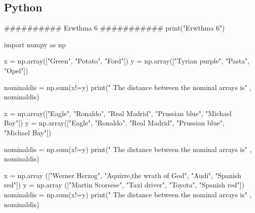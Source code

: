 \documentclass[10pt,towside,a4paper]{article}
\begin{document}
\subsection{Python}
\begin{python}
##########  Erwthma 6 ###########
print("Erwthma 6")

import numpy as np

x = np.array(["Green", "Potato", "Ford"])
y = np.array(["Tyrian purple", "Pasta", "Opel"])

nominaldis = np.sum(x!=y)
print(" The distance between the nominal arrays is" , nominaldis)     

x = np.array(["Eagle", "Ronaldo", "Real Madrid", "Prussian blue", "Michael Bay"])
y = np.array(["Eagle", "Ronaldo", "Real Madrid", "Prussian blue", "Michael Bay"])

nominaldis = np.sum(x!=y)
print(" The distance between the nominal arrays is" , nominaldis)             

x = np.array (["Werner Herzog", "Aquirre,the wrath of God", "Audi", "Spanish red"])
y = np.array (["Martin Scorsese", "Taxi driver", "Toyota", "Spanish red"])
nominaldis = np.sum(x!=y)
print(" The distance between the nominal arrays is" , nominaldis) 
\end{python}
 
\end{document}
